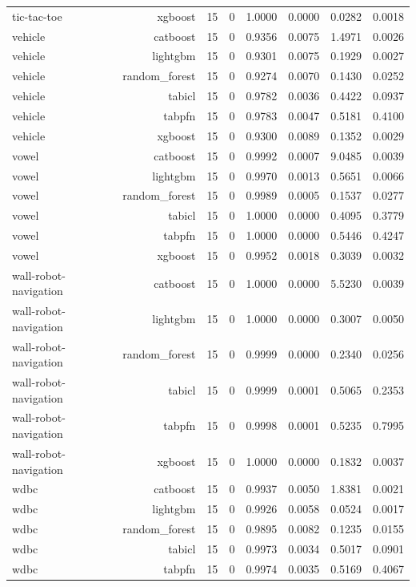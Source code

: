 \begin{table}[htbp]
\begin{tabular}{lrrrrrrr}
tic-tac-toe & xgboost & 15 & 0 & 1.0000 & 0.0000 & 0.0282 & 0.0018 \\
vehicle & catboost & 15 & 0 & 0.9356 & 0.0075 & 1.4971 & 0.0026 \\
vehicle & lightgbm & 15 & 0 & 0.9301 & 0.0075 & 0.1929 & 0.0027 \\
vehicle & random\_forest & 15 & 0 & 0.9274 & 0.0070 & 0.1430 & 0.0252 \\
vehicle & tabicl & 15 & 0 & 0.9782 & 0.0036 & 0.4422 & 0.0937 \\
vehicle & tabpfn & 15 & 0 & 0.9783 & 0.0047 & 0.5181 & 0.4100 \\
vehicle & xgboost & 15 & 0 & 0.9300 & 0.0089 & 0.1352 & 0.0029 \\
vowel & catboost & 15 & 0 & 0.9992 & 0.0007 & 9.0485 & 0.0039 \\
vowel & lightgbm & 15 & 0 & 0.9970 & 0.0013 & 0.5651 & 0.0066 \\
vowel & random\_forest & 15 & 0 & 0.9989 & 0.0005 & 0.1537 & 0.0277 \\
vowel & tabicl & 15 & 0 & 1.0000 & 0.0000 & 0.4095 & 0.3779 \\
vowel & tabpfn & 15 & 0 & 1.0000 & 0.0000 & 0.5446 & 0.4247 \\
vowel & xgboost & 15 & 0 & 0.9952 & 0.0018 & 0.3039 & 0.0032 \\
wall-robot-navigation & catboost & 15 & 0 & 1.0000 & 0.0000 & 5.5230 & 0.0039 \\
wall-robot-navigation & lightgbm & 15 & 0 & 1.0000 & 0.0000 & 0.3007 & 0.0050 \\
wall-robot-navigation & random\_forest & 15 & 0 & 0.9999 & 0.0000 & 0.2340 & 0.0256 \\
wall-robot-navigation & tabicl & 15 & 0 & 0.9999 & 0.0001 & 0.5065 & 0.2353 \\
wall-robot-navigation & tabpfn & 15 & 0 & 0.9998 & 0.0001 & 0.5235 & 0.7995 \\
wall-robot-navigation & xgboost & 15 & 0 & 1.0000 & 0.0000 & 0.1832 & 0.0037 \\
wdbc & catboost & 15 & 0 & 0.9937 & 0.0050 & 1.8381 & 0.0021 \\
wdbc & lightgbm & 15 & 0 & 0.9926 & 0.0058 & 0.0524 & 0.0017 \\
wdbc & random\_forest & 15 & 0 & 0.9895 & 0.0082 & 0.1235 & 0.0155 \\
wdbc & tabicl & 15 & 0 & 0.9973 & 0.0034 & 0.5017 & 0.0901 \\
wdbc & tabpfn & 15 & 0 & 0.9974 & 0.0035 & 0.5169 & 0.4067 \\

\end{tabular}
\end{table}
